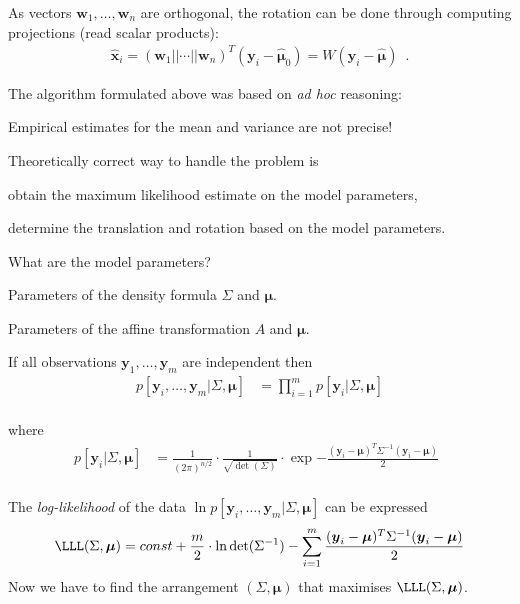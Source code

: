 \documentclass[landscape,footrule]{foils}
\renewcommand{\vec}[1]{\boldsymbol{#1}}
\newcommand{\lastline}{\vspace*{-2ex}}
\begin{document}
As vectors $\vec{w}_1,\ldots,\vec{w}_n$ are orthogonal, the rotation can be done through computing projections (read scalar products):
\begin{align*}
\hat{\vec{x}}_i= (\vec{w}_1 ||\cdots|| \vec{w}_n)^T (\vec{y}_i-\hat{\vec{\mu}}_0)=W(\vec{y}_i-\hat{\vec{\mu}})\enspace.
\end{align*}  



The algorithm formulated above was based on \emph{ad hoc} reasoning:
\begin{triangles}
\item Empirical estimates for the mean and variance are not precise!
\end{triangles}\vspace*{1.5cm}

Theoretically correct way to handle the problem is
\begin{triangles}
\item obtain the maximum likelihood estimate on the model parameters,
\item determine the translation and rotation based on the model parameters.
\end{triangles}\vspace*{1.5cm}

What are the model parameters?
\begin{triangles}
\item Parameters of the density formula $\Sigma$ and $\vec{\mu}$.
\item Parameters of the affine transformation $A$ and $\vec{\mu}$.
\end{triangles}

If all observations $\vec{y}_1,\ldots,\vec{y}_m$ are independent then\vspace*{-0ex}
\begin{align*}
p[\vec{y}_i,\ldots,\vec{y}_m|\Sigma,\vec{\mu}]
&=\prod_{i=1}^m p[\vec{y}_i|\Sigma,\vec{\mu}]
\end{align*}\vspace*{-4ex}\\
where\vspace*{-0ex}
\begin{align*}
p[\vec{y}_i|\Sigma,\vec{\mu}]
&=\frac{1}{(2\pi)^{n/2}}\cdot\frac{1}{\sqrt{\det(\Sigma)}}\cdot
\exp{-\frac{(\vec{y}_i-\vec{\mu})^T \Sigma^{-1}(\vec{y}_i-\vec{\mu})}{2}}\enspace
\end{align*}\vspace*{-0ex}\\
The \emph{log-likelihood} of the data $\ln p[\vec{y}_i,\ldots,\vec{y}_m|\Sigma,\vec{\mu}]$ can be expressed \vspace*{-0ex}
\begin{align*}
\LLL(\Sigma,\vec{\mu})=const +\frac{m}{2}\cdot \ln\det(\Sigma^{-1}) 
-\sum_{i=1}^m\frac{(\vec{y}_i-\vec{\mu})^T \Sigma^{-1}(\vec{y}_i-\vec{\mu})}{2}
\end{align*}
Now we have to find the arrangement $(\Sigma,\vec{\mu})$ that maximises $\LLL(\Sigma,\vec{\mu})$.\lastline
 
\end{document}
